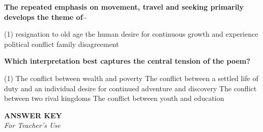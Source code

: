 \documentclass[12pt,a4paper]{exam}
\begin{document}
\begin{questions}
	\begin{minipage}{\textwidth}
		\question \textbf{The repeated emphasis on movement, travel and seeking primarily develops the theme of--}

		\begin{tasks}(1)
			\task resignation to old age
			\task the human desire for continuous growth and experience
			\task political conflict
			\task family disagreement
		\end{tasks}
	\end{minipage}


	\begin{minipage}{\textwidth}
		\question \textbf{Which interpretation best captures the central tension of the poem?}

		\begin{tasks}(1)
			\task The conflict between wealth and poverty
			\task The conflict between a settled life of duty and an individual desire for continued adventure and discovery
			\task The conflict between two rival kingdoms
			\task The conflict between youth and education
		\end{tasks}
	\end{minipage}

\end{questions}


\newpage

\begin{center}
	{\Large\bfseries ANSWER KEY}\\[4pt]
	\textit{For Teacher's Use}
\end{center}

\vspace{8pt}
\end{document}
